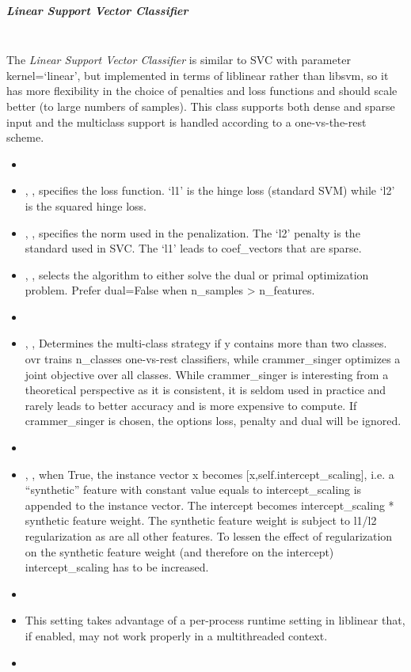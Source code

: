 \subparagraph{Linear Support Vector Classifier}
\mbox{}
\\The \textit{Linear Support Vector Classifier} is similar to SVC with parameter
kernel=`linear', but implemented in terms of liblinear rather than libsvm,
so it has more flexibility in the choice of penalties and loss functions and
should scale better (to large numbers of samples).
%
This class supports both dense and sparse input and the multiclass support is
handled according to a one-vs-the-rest scheme.
%
\begin{itemize}
  \item {}
  \item {}, , specifies the loss
  function.
  `l1' is the hinge loss (standard SVM) while `l2' is the squared hinge
  loss.
  \item {}, , specifies the norm
  used in the penalization.
  The `l2' penalty is the standard used in SVC.
  The `l1' leads to coef\_vectors that are sparse.
  \item {}, , selects the algorithm to either solve
  the dual or primal optimization problem.
  Prefer dual=False when n\_samples > n\_features.
  \item \tolSVMDescription{}
  \item {}, ,
  Determines the multi-class strategy if y contains more than two classes.
  ovr trains n\_classes one-vs-rest classifiers, while
  crammer\_singer optimizes a joint objective over all classes.
  While crammer\_singer is interesting from a theoretical perspective as it is
  consistent, it is seldom used in practice and rarely leads to better accuracy
  and is more expensive to compute.
  If crammer\_singer is chosen, the options loss, penalty and dual
  will be ignored.
  \item {}
  \item {}, , when
  True, the instance vector x becomes [x,self.intercept\_scaling], i.e. a
  ``synthetic'' feature with constant value equals to intercept\_scaling is
  appended to the instance vector.
  The intercept becomes intercept\_scaling * synthetic feature
  weight.
  \nb The synthetic feature weight is subject to l1/l2 regularization as are all
  other features.
  To lessen the effect of regularization on the synthetic feature weight (and
  therefore on the intercept) intercept\_scaling has to be increased.
  \item \classWeightDescription{}
  \item \verDescriptionB{}
  \nb This setting takes advantage of a per-process runtime setting in liblinear
  that, if enabled, may not work properly in a multithreaded context.
  \item {}
\end{itemize}

